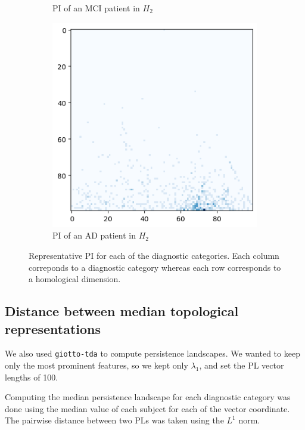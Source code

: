 \documentclass{article}
\begin{document}
\begin{figure}
\begin{subfigure}{0.32\textwidth}
    \caption{PI of an MCI patient in $H_2$}
  \end{subfigure}
  \begin{subfigure}{0.32\textwidth}
    \includegraphics[width=\textwidth]{figures/PIs/Persistence_image_AD_h_2.png}
    \caption{PI of an AD patient in $H_2$}
  \end{subfigure}
  \caption{Representative PI for each of the diagnostic categories. Each column correponds to a diagnostic category whereas each row corresponds to a homological dimension.}
  \label{fig:sample_rep_pi}
\end{figure}

\subsection{Distance between median topological representations}

We also used \texttt{giotto-tda} to compute persistence landscapes. We wanted to keep only the most prominent features, so we kept only $\lambda_1$, and set the PL vector lengths of 100.

Computing the median persistence landscape for each diagnostic category was done using the median value of each subject for each of the vector coordinate. The pairwise distance between two PLs was taken using the $L^1$ norm.
\end{document}
